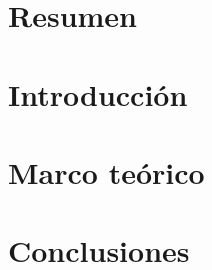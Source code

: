 \documentclass[12pt,letterpaper]{article}
\begin{document}

\tableofcontents
\pagebreak
\section{Resumen}

\section{Introducción}

\section{Marco teórico}

\section{Conclusiones}



\end{document}
